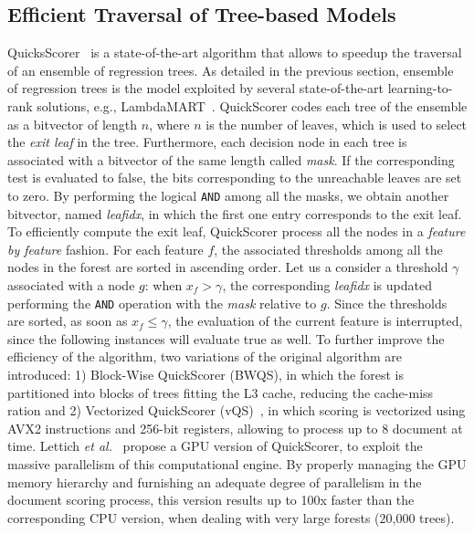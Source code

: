 \subsection{Efficient Traversal of Tree-based Models}
\label{subsec:quickscorer}
QuicksScorer~\cite{lucchese2015quickscorer} is a state-of-the-art algorithm that allows to speedup the traversal of an ensemble of regression trees. As detailed in the previous section, ensemble of regression trees is the model exploited by several state-of-the-art learning-to-rank solutions, e.g., LambdaMART~\cite{burges2010ranknet}.
QuickScorer codes each tree of the ensemble as a bitvector of length $n$, where $n$ is the number of leaves, which is used to select the \textit{exit leaf} in the tree. Furthermore, each decision node in each tree is associated with a bitvector of the same length called \textit{mask}. If the corresponding test is evaluated to false, the bits corresponding to the unreachable leaves are set to zero. By performing the logical \texttt{AND} among all the masks, we obtain another bitvector, named \emph{leafidx}, in which the first one entry corresponds to the exit leaf. To efficiently compute the exit leaf, QuickScorer process all the nodes in a \textit{feature by feature} fashion. For each feature $f$, the associated thresholds among all the nodes in the forest are sorted in ascending order. Let us a consider a threshold $\gamma$ associated with a node $g$: when $x_f > \gamma$, 
the corresponding \emph{leafidx} is updated performing the \texttt{AND} operation with the \emph{mask} relative to $g$. Since the thresholds are sorted, as soon as $x_f \leq \gamma$, the evaluation of the current feature is interrupted, since the following instances will evaluate true as well. To further improve the efficiency of the algorithm, two variations of the original algorithm are introduced:  1) Block-Wise QuickScorer (BWQS), in which the forest is partitioned into blocks of trees fitting the L3 cache, reducing the cache-miss ration and 2) Vectorized QuickScorer (vQS)~\cite{lucchese2016exploiting}, in which scoring is vectorized using AVX2 instructions and 256-bit registers, allowing to process up to $8$ document at time. 
Lettich \emph{et al.}~\cite{8035185} propose a GPU version of QuickScorer, to exploit the massive parallelism of this computational engine. By properly managing the GPU memory hierarchy and furnishing an adequate degree of parallelism in the document scoring process, this version results up to 100x faster than the corresponding CPU version, when dealing with very large forests ($20$,$000$ trees).
 
